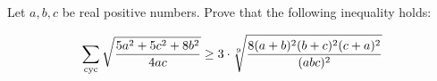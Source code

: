 Let $a,b,c$ be real positive numbers. Prove that the following inequality holds:

\[{
\sum_{\rm cyc}\sqrt{5a^2+5c^2+8b^2\over 4ac}\ge 3\cdot  \root 9 \of{8(a+b)^2(b+c)^2(c+a)^2\over (abc)^2}
}\]